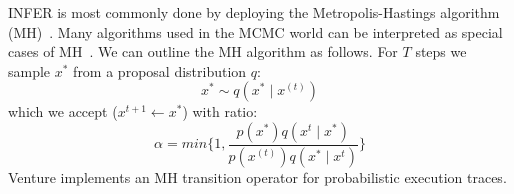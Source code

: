 \documentclass{article} %
\begin{document}
INFER is most commonly done by deploying the Metropolis-Hastings algorithm (MH)~\citep{metropolis1953equation}.  Many algorithms used in the MCMC world can be interpreted as special cases of MH~\citep{andrieu2003introduction}. We can outline the MH algorithm as follows. For $T$ steps we sample $x^*$ from a proposal distribution $q$:
\begin{equation}
 x^* \sim q(x^* \mid x^{(t)})
\end{equation}
which we accept ($x^{t+1} \leftarrow x ^*$) with ratio:
\begin{equation}
\alpha = min \bigg\{1,\frac{p(x^*) q(x^{t}\mid x^*)}{p(x^{(t)}) q(x^* \mid x^{t})} \bigg\}  
\end{equation}
Venture implements an MH transition operator for probabilistic execution traces.
\end{document}
